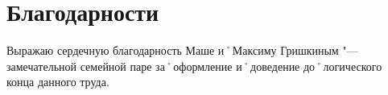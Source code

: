 ﻿\chapter{Благодарности}

Выражаю сердечную благодарность Маше и˚Максиму Гришкиным "--- замечательной семейной паре за˚оформление и˚доведение до˚логического конца данного труда.